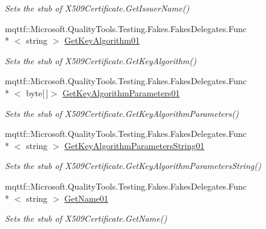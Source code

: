 \begin{DoxyCompactItemize}
\begin{DoxyCompactList}\small\item\em Sets the stub of X509\-Certificate.\-Get\-Issuer\-Name()\end{DoxyCompactList}\item 
mqttf\-::\-Microsoft.\-Quality\-Tools.\-Testing.\-Fakes.\-Fakes\-Delegates.\-Func\\*
$<$ string $>$ \hyperlink{class_system_1_1_security_1_1_cryptography_1_1_x509_certificates_1_1_fakes_1_1_stub_x509_certificate_a863bf667a157291fc993facde6bad83e}{Get\-Key\-Algorithm01}
\begin{DoxyCompactList}\small\item\em Sets the stub of X509\-Certificate.\-Get\-Key\-Algorithm()\end{DoxyCompactList}\item 
mqttf\-::\-Microsoft.\-Quality\-Tools.\-Testing.\-Fakes.\-Fakes\-Delegates.\-Func\\*
$<$ byte\mbox{[}$\,$\mbox{]}$>$ \hyperlink{class_system_1_1_security_1_1_cryptography_1_1_x509_certificates_1_1_fakes_1_1_stub_x509_certificate_aeab755add8bd76dc54d14e43b45b8595}{Get\-Key\-Algorithm\-Parameters01}
\begin{DoxyCompactList}\small\item\em Sets the stub of X509\-Certificate.\-Get\-Key\-Algorithm\-Parameters()\end{DoxyCompactList}\item 
mqttf\-::\-Microsoft.\-Quality\-Tools.\-Testing.\-Fakes.\-Fakes\-Delegates.\-Func\\*
$<$ string $>$ \hyperlink{class_system_1_1_security_1_1_cryptography_1_1_x509_certificates_1_1_fakes_1_1_stub_x509_certificate_af7fb53391b3378ab71793c1ac5a0abce}{Get\-Key\-Algorithm\-Parameters\-String01}
\begin{DoxyCompactList}\small\item\em Sets the stub of X509\-Certificate.\-Get\-Key\-Algorithm\-Parameters\-String()\end{DoxyCompactList}\item 
mqttf\-::\-Microsoft.\-Quality\-Tools.\-Testing.\-Fakes.\-Fakes\-Delegates.\-Func\\*
$<$ string $>$ \hyperlink{class_system_1_1_security_1_1_cryptography_1_1_x509_certificates_1_1_fakes_1_1_stub_x509_certificate_a60c52e63880e6b5c003e252eff40c149}{Get\-Name01}
\begin{DoxyCompactList}\small\item\em Sets the stub of X509\-Certificate.\-Get\-Name()\end{DoxyCompactList}\item 

\end{DoxyCompactItemize}
